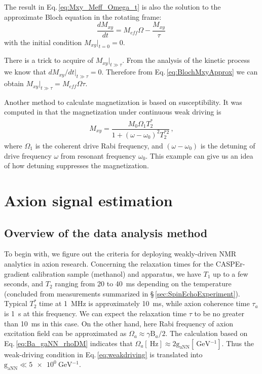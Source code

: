 The result in Eq.\,\eqref{eq:Mxy_Meff_Omega_t} is also the solution to the approximate Bloch equation in the rotating frame:
\begin{equation}
    \dfrac{d M_{xy}}{dt} = M_{eff}\Omega  - \dfrac{M_{xy}}{\tau}\, \label{eq:BlochMxyApprox}
\end{equation}
with the initial condition $M_{xy}|_{t=0} = 0$. 

There is a trick to acquire of $M_{xy}|_{t\gg\tau}$. From the analysis of the kinetic process we know that $dM_{xy}/dt|_{t\gg \tau}=0$. Therefore from Eq.\,\eqref{eq:BlochMxyApprox} we can obtain $M_{xy}|_{t\gg\tau} = M_{eff} \Omega \tau$. 

Another method to calculate magnetization is based on susceptibility. It was computed in \cite{Aybas_QuantumSensitivity} that the magnetization under continuous weak driving is
\begin{align}
    M_{xy} = \dfrac{M_0 \Omega_1 T_2^*}{ 1 + (\omega - \omega_0)^2 T_2^{*2} }\,,\label{eq:Mxy_detuning}
\end{align}
where $\Omega_1$ is the coherent drive Rabi frequency, and $(\omega - \omega_0)$ is the detuning of drive frequency $\omega$ from resonant frequency $\omega_0$. 
This example can give us an idea of how detuning suppresses the magnetization. 


\section{Axion signal estimation}\label{sec:axion_signal_estimation}

\subsection{Overview of the data analysis method}

To begin with, we figure out the criteria for deploying weakly-driven NMR analytics in axion research. Concerning the relaxation times for the CASPEr-gradient calibration sample (methanol) and apparatus, we have $T_1$ up to a few seconds, and $T_2$ ranging from \SI{20}{} to \SI{40}{\ms} depending on the temperature (concluded from measurements summarized in \S\,\ref{sec:SpinEchoExperiment}). Typical $T_2^*$ time at \SI{1}{\MHz} is approximately \SI{10}{\milli\second}, while axion coherence time $\tau_a$ is \SI{1}{\second} at this frequency. 
We can expect the relaxation time $\tau$ to be no greater than \SI{10}{\milli\second} in this case. 
On the other hand, here Rabi frequency of axion excitation field can be approximated as $\Omega_a \approx \gamma \mathrm{B}_a/2$. The calculation based on Eq.\,\eqref{eq:Ba_gaNN_rhoDM} indicates that $\Omega_a [\SI{}{\Hz}]  \approx 2 \mathrm{g_{aNN}} [\SI{}{\GeV^{-1}}] $. Thus the weak-driving condition in Eq.\,\eqref{eq:weakdriving} is translated into $\mathrm{g_{aNN}} \ll \SI{5e0}{\GeV^{-1}}$. 

